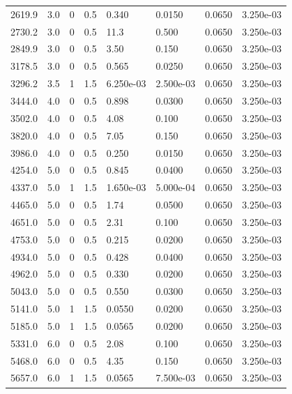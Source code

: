 \documentclass[preview]{standalone}
\begin{document}
{{\begin{tabular}{L{1.2cm}C{1.2cm} C{0.3cm}C{0.5cm} C{1.4cm}C{1.4cm} C{1.4cm}C{1.4cm}}
  2619.9  &   3.0  & 0     & 0.5 &  0.340  & 0.0150  & 0.0650 &  3.250e-03   \\ 
  2730.2  &   3.0  & 0     & 0.5 &  11.3  & 0.500  & 0.0650 &  3.250e-03   \\ 
  2849.9  &   3.0  & 0     & 0.5 &  3.50  & 0.150  & 0.0650 &  3.250e-03   \\ 
  3178.5  &   3.0  & 0     & 0.5 &  0.565  & 0.0250  & 0.0650 &  3.250e-03   \\ 
  3296.2  &   3.5  & 1     & 1.5 &  6.250e-03  & 2.500e-03  & 0.0650 &  3.250e-03   \\ 
  3444.0  &   4.0  & 0     & 0.5 &  0.898  & 0.0300  & 0.0650 &  3.250e-03   \\ 
  3502.0  &   4.0  & 0     & 0.5 &  4.08  & 0.100  & 0.0650 &  3.250e-03   \\ 
  3820.0  &   4.0  & 0     & 0.5 &  7.05  & 0.150  & 0.0650 &  3.250e-03   \\ 
  3986.0  &   4.0  & 0     & 0.5 &  0.250  & 0.0150  & 0.0650 &  3.250e-03   \\ 
  4254.0  &   5.0  & 0     & 0.5 &  0.845  & 0.0400  & 0.0650 &  3.250e-03   \\ 
  4337.0  &   5.0  & 1     & 1.5 &  1.650e-03  & 5.000e-04  & 0.0650 &  3.250e-03   \\ 
  4465.0  &   5.0  & 0     & 0.5 &  1.74  & 0.0500  & 0.0650 &  3.250e-03   \\ 
  4651.0  &   5.0  & 0     & 0.5 &  2.31  & 0.100  & 0.0650 &  3.250e-03   \\ 
  4753.0  &   5.0  & 0     & 0.5 &  0.215  & 0.0200  & 0.0650 &  3.250e-03   \\ 
  4934.0  &   5.0  & 0     & 0.5 &  0.428  & 0.0400  & 0.0650 &  3.250e-03   \\ 
  4962.0  &   5.0  & 0     & 0.5 &  0.330  & 0.0200  & 0.0650 &  3.250e-03   \\ 
  5043.0  &   5.0  & 0     & 0.5 &  0.550  & 0.0300  & 0.0650 &  3.250e-03   \\ 
  5141.0  &   5.0  & 1     & 1.5 &  0.0550  & 0.0200  & 0.0650 &  3.250e-03   \\ 
  5185.0  &   5.0  & 1     & 1.5 &  0.0565  & 0.0200  & 0.0650 &  3.250e-03   \\ 
  5331.0  &   6.0  & 0     & 0.5 &  2.08  & 0.100  & 0.0650 &  3.250e-03   \\ 
  5468.0  &   6.0  & 0     & 0.5 &  4.35  & 0.150  & 0.0650 &  3.250e-03   \\ 
  5657.0  &   6.0  & 1     & 1.5 &  0.0565  & 7.500e-03  & 0.0650 &  3.250e-03   \\ 

\end{tabular}}}
\end{document}
